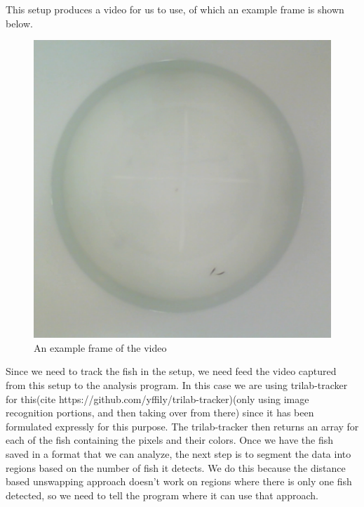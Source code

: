 \documentclass{article}
\begin{document}
This setup produces a video for us to use, of which an example frame is shown below.

\begin{figure}[H]
	\centering
	\includegraphics[width=.5\linewidth]{figures.frame5140}
	\caption{An example frame of the video}
\end{figure}

Since we need to track the fish in the setup, we need feed the video captured from this setup to the analysis program. In this case we are using trilab-tracker for this(cite https://github.com/yffily/trilab-tracker)(only using image recognition portions, and then taking over from there) since it has been formulated expressly for this purpose. The trilab-tracker then returns an array for each of the fish containing the pixels and their colors. Once we have the fish saved in a format that we can analyze, the next step is to segment the data into regions based on the number of fish it detects. We do this because the distance based unswapping approach doesn't work on regions where there is only one fish detected, so we need to tell the program where it can use that approach.
\end{document}
